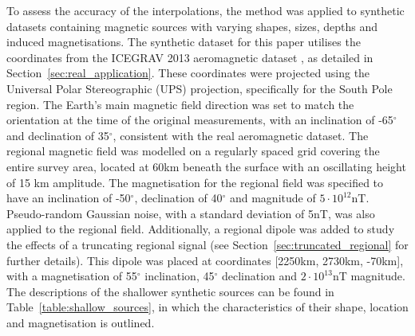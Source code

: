 To assess the accuracy of the interpolations, the method was applied to synthetic datasets containing magnetic sources with varying shapes, sizes, depths and induced magnetisations. The synthetic dataset for this paper utilises the coordinates from the ICEGRAV 2013 aeromagnetic dataset \citep{ICEGRAV_data}, as detailed in Section~\ref{sec:real_application}. These coordinates were projected using the Universal Polar Stereographic (UPS) projection, specifically for the South Pole region. The Earth's main magnetic field direction was set to match the orientation at the time of the original measurements, with an inclination of -65$^\circ$ and declination of 35$^\circ$, consistent with the real aeromagnetic dataset. The regional magnetic field was modelled on a regularly spaced grid covering the entire survey area, located at 60km beneath the surface with an oscillating height of 15 km amplitude. The magnetisation for the regional field was specified to have an inclination of -50$^\circ$, declination of 40$^\circ$ and magnitude of $5 \cdot 10^{12}$nT. Pseudo-random Gaussian noise, with a standard deviation of 5nT, was also applied to the regional field. Additionally, a regional dipole was added to study the effects of a truncating regional signal (see Section~\ref{sec:truncated_regional} for further details). This dipole was placed at coordinates [2250km, 2730km, -70km], with a magnetisation of 55$^\circ$ inclination, 45$^\circ$ declination and $2 \cdot 10^{13}$nT magnitude. The descriptions of the shallower synthetic sources can be found in Table~\ref{table:shallow_sources}, in which the characteristics of their shape, location and magnetisation is outlined.
\clearpage
